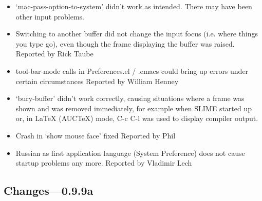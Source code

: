 \begin{itemize}

\item `mac-pass-option-to-system' didn't work as intended. There may
        have been other input problems.

\item Switching to another buffer did not change the input focus
        (i.e. where things you type go), even though the frame displaying
        the buffer was raised.
        Reported by Rick Taube

\item tool-bar-mode calls in Preferences.el / .emacs could bring up
        errors under certain circumstances
        Reported by William Henney

\item `bury-buffer' didn't work correctly, causing situations where a
        frame was shown and was removed immediately, for example when
        SLIME started up or, in LaTeX (AUCTeX) mode, C-c C-l was used to
        display compiler output.

\item Crash in `show mouse face' fixed
        Reported by Phil

\item  Russian as first application language (System Preference) does
        not cause startup problems any more.
        Reported by Vladimir Lech

\end{itemize}



\subsection{Changes---0.9.9a}

